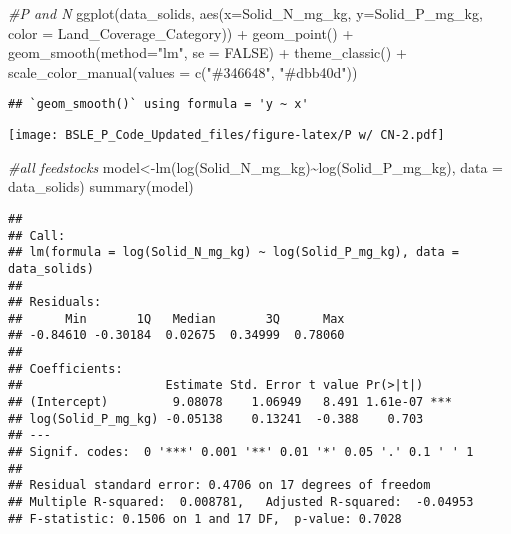 \documentclass[
]{article}
\newenvironment{Shaded}{\begin{snugshade}}{\end{snugshade}}
\newcommand{\AttributeTok}[1]{\textcolor[rgb]{0.77,0.63,0.00}{#1}}
\newcommand{\CommentTok}[1]{\textcolor[rgb]{0.56,0.35,0.01}{\textit{#1}}}
\newcommand{\ConstantTok}[1]{\textcolor[rgb]{0.00,0.00,0.00}{#1}}
\newcommand{\FunctionTok}[1]{\textcolor[rgb]{0.00,0.00,0.00}{#1}}
\newcommand{\NormalTok}[1]{#1}
\newcommand{\OtherTok}[1]{\textcolor[rgb]{0.56,0.35,0.01}{#1}}
\newcommand{\SpecialCharTok}[1]{\textcolor[rgb]{0.00,0.00,0.00}{#1}}
\newcommand{\StringTok}[1]{\textcolor[rgb]{0.31,0.60,0.02}{#1}}
\begin{document}
\begin{Shaded}
\begin{Highlighting}[]
\CommentTok{\#P and N}
\FunctionTok{ggplot}\NormalTok{(data\_solids, }\FunctionTok{aes}\NormalTok{(}\AttributeTok{x=}\NormalTok{Solid\_N\_mg\_kg, }\AttributeTok{y=}\NormalTok{Solid\_P\_mg\_kg, }\AttributeTok{color =}\NormalTok{ Land\_Coverage\_Category)) }\SpecialCharTok{+} \FunctionTok{geom\_point}\NormalTok{() }\SpecialCharTok{+} \FunctionTok{geom\_smooth}\NormalTok{(}\AttributeTok{method=}\StringTok{"lm"}\NormalTok{, }\AttributeTok{se =} \ConstantTok{FALSE}\NormalTok{) }\SpecialCharTok{+} \FunctionTok{theme\_classic}\NormalTok{() }\SpecialCharTok{+} \FunctionTok{scale\_color\_manual}\NormalTok{(}\AttributeTok{values =} \FunctionTok{c}\NormalTok{(}\StringTok{"\#346648"}\NormalTok{, }\StringTok{"\#dbb40d"}\NormalTok{))}
\end{Highlighting}
\end{Shaded}

\begin{verbatim}
## `geom_smooth()` using formula = 'y ~ x'
\end{verbatim}

\texttt{[image: BSLE\_P\_Code\_Updated\_files/figure-latex/P w/ CN-2.pdf]}

\begin{Shaded}
\begin{Highlighting}[]
\CommentTok{\#all feedstocks}
\NormalTok{model}\OtherTok{\textless{}{-}}\FunctionTok{lm}\NormalTok{(}\FunctionTok{log}\NormalTok{(Solid\_N\_mg\_kg)}\SpecialCharTok{\textasciitilde{}}\FunctionTok{log}\NormalTok{(Solid\_P\_mg\_kg), }\AttributeTok{data =}\NormalTok{ data\_solids)}
\FunctionTok{summary}\NormalTok{(model)}
\end{Highlighting}
\end{Shaded}

\begin{verbatim}
## 
## Call:
## lm(formula = log(Solid_N_mg_kg) ~ log(Solid_P_mg_kg), data = data_solids)
## 
## Residuals:
##      Min       1Q   Median       3Q      Max 
## -0.84610 -0.30184  0.02675  0.34999  0.78060 
## 
## Coefficients:
##                    Estimate Std. Error t value Pr(>|t|)    
## (Intercept)         9.08078    1.06949   8.491 1.61e-07 ***
## log(Solid_P_mg_kg) -0.05138    0.13241  -0.388    0.703    
## ---
## Signif. codes:  0 '***' 0.001 '**' 0.01 '*' 0.05 '.' 0.1 ' ' 1
## 
## Residual standard error: 0.4706 on 17 degrees of freedom
## Multiple R-squared:  0.008781,   Adjusted R-squared:  -0.04953 
## F-statistic: 0.1506 on 1 and 17 DF,  p-value: 0.7028
\end{verbatim}
\end{document}
